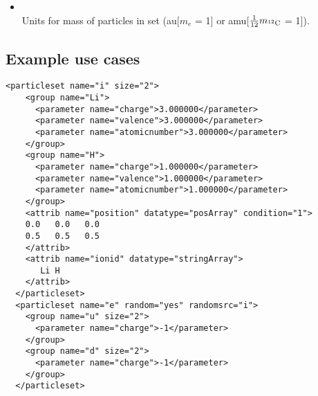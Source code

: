 \begin{itemize}
\item {} \\
Units for mass of particles in set (au[$m_e$ = 1] or amu[$\frac{1}{12}m_{\rm ^{12}C}$ = 1]).
\end{itemize}



\subsection{Example use cases}
\begin{minipage}{\linewidth}
\begin{lstlisting}[style=QMCPXML,caption=particleset elements for ions and electrons randomizing electron start positions.]
  <particleset name="i" size="2">
    <group name="Li">
      <parameter name="charge">3.000000</parameter>
      <parameter name="valence">3.000000</parameter>
      <parameter name="atomicnumber">3.000000</parameter>
    </group>
    <group name="H">
      <parameter name="charge">1.000000</parameter>
      <parameter name="valence">1.000000</parameter>
      <parameter name="atomicnumber">1.000000</parameter>
    </group>
    <attrib name="position" datatype="posArray" condition="1">
    0.0   0.0   0.0
    0.5   0.5   0.5
    </attrib>
    <attrib name="ionid" datatype="stringArray">
       Li H
    </attrib>
  </particleset>
  <particleset name="e" random="yes" randomsrc="i">
    <group name="u" size="2">
      <parameter name="charge">-1</parameter>
    </group>
    <group name="d" size="2">
      <parameter name="charge">-1</parameter>
    </group>
  </particleset>                 
\end{lstlisting}
\end{minipage}

